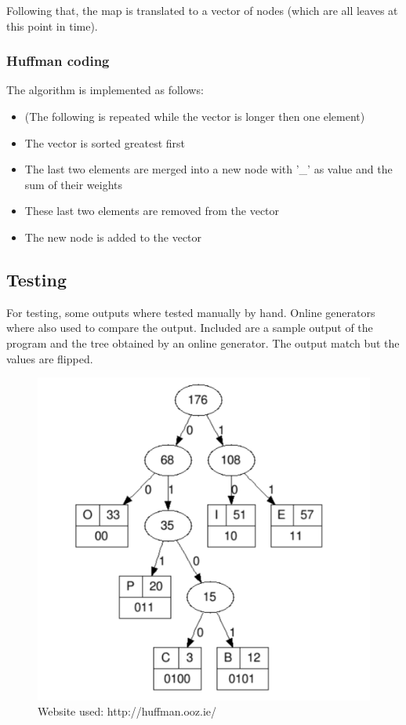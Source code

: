 \documentclass[a4paper, 12pt]{article}
\begin{document}
Following that, the map is translated to a vector of nodes (which are all leaves at this point in time).

\subsubsection{Huffman coding}
The algorithm is implemented as follows:

\begin{itemize}
\item (The following is repeated while the vector is longer then one element)
\item The vector is sorted greatest first
\item The last two elements are merged into a new node with '\_' as value and the sum of their weights
\item These last two elements are removed from the vector
\item The new node is added to the vector
\end{itemize}


\subsection{Testing}
For testing, some outputs where tested manually by hand. Online generators where also used to compare the output. Included are
a sample output of the program and the tree obtained by an online generator. The output match but the values are flipped.


\begin{figure}
    \centering
    \includegraphics[width=1\textwidth]{huffman_1}
    \caption{Website used: http://huffman.ooz.ie/}
\end{figure}
\end{document}
